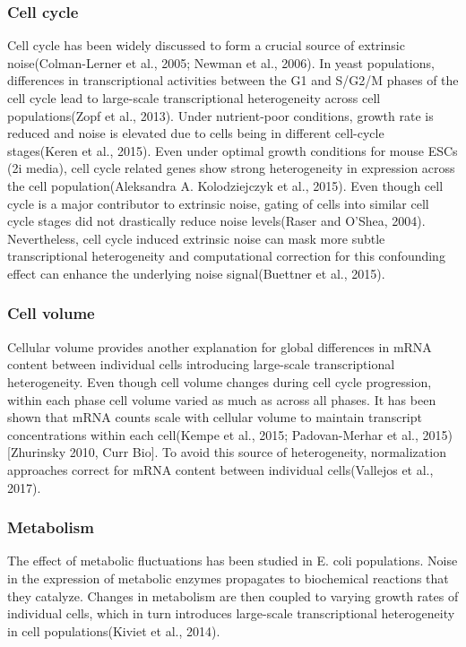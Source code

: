 \subsubsection{Cell cycle}

Cell cycle has been widely discussed to form a crucial source of extrinsic noise(Colman-Lerner et al., 2005; Newman et al., 2006). In yeast populations, differences in transcriptional activities between the G1 and S/G2/M phases of the cell cycle lead to large-scale transcriptional heterogeneity across cell populations(Zopf et al., 2013). Under nutrient-poor conditions, growth rate is reduced and noise is elevated due to cells being in different cell-cycle stages(Keren et al., 2015).  Even under optimal growth conditions for mouse ESCs (2i media), cell cycle related genes show strong heterogeneity in expression across the cell population(Aleksandra A. Kolodziejczyk et al., 2015). Even though cell cycle is a major contributor to extrinsic noise, gating of cells into similar cell cycle stages did not drastically reduce noise levels(Raser and O’Shea, 2004). Nevertheless, cell cycle induced extrinsic noise can mask more subtle transcriptional heterogeneity and computational correction for this confounding effect can enhance the underlying noise signal(Buettner et al., 2015). 

\subsubsection{Cell volume}

Cellular volume provides another explanation for global differences in mRNA content between individual cells introducing large-scale transcriptional heterogeneity. Even though cell volume changes during cell cycle progression, within each phase cell volume varied as much as across all phases. It has been shown that mRNA counts scale with cellular volume to maintain transcript concentrations within each cell(Kempe et al., 2015; Padovan-Merhar et al., 2015)[Zhurinsky 2010, Curr Bio]. To avoid this source of heterogeneity, normalization approaches correct for mRNA content between individual cells(Vallejos et al., 2017).

\subsubsection{Metabolism}

The effect of metabolic fluctuations has been studied in E. coli populations. Noise in the expression of metabolic enzymes propagates to biochemical reactions that they catalyze. Changes in metabolism are then coupled to varying growth rates of individual cells, which in turn introduces large-scale transcriptional heterogeneity in cell populations(Kiviet et al., 2014).  

